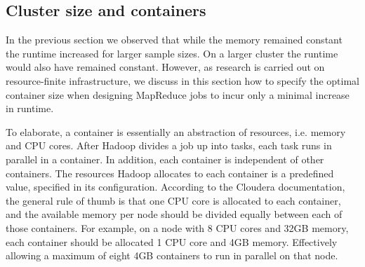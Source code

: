 \documentclass{bioinfo}
\begin{document}

\subsection*{Cluster size and containers}
In the previous section we observed that while the memory remained constant the runtime increased for larger sample sizes. 
On a larger cluster the runtime would also have remained constant. 
However, as research is carried out on resource-finite infrastructure, we discuss in this section how to specify the optimal container size when designing MapReduce jobs to incur only a minimal increase in runtime. 

To elaborate, a container is essentially an abstraction of resources, i.e. memory and CPU cores. 
After Hadoop divides a job up into tasks, each task runs in parallel in a container. In addition, each container is independent of other containers.
The resources Hadoop allocates to each container is a predefined value, specified in its configuration. 
According to the Cloudera documentation, the general rule of thumb is that one CPU core is allocated to each container, and the available memory per node should be divided equally between each of those containers. 
For example, on a node with 8 CPU cores and 32GB memory, each container should be allocated 1 CPU core and 4GB memory. Effectively allowing a maximum of eight 4GB containers to run in parallel on that node.
\end{document}

